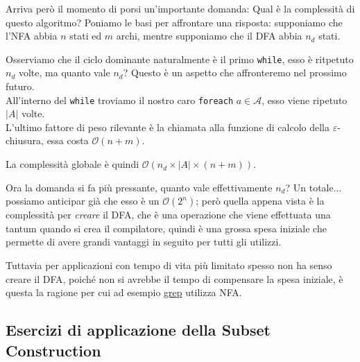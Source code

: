 \documentclass[class=book, crop=false, oneside, 12pt]{standalone}
\begin{document}
\noindent Arriva però il momento di porsi un'importante domanda: Qual è la complessità di questo algoritmo?
Poniamo le basi per affrontare una risposta: supponiamo che l’NFA abbia \(n\) stati ed \(m\) archi, mentre supponiamo che il DFA abbia \(n_d\) stati.

Osserviamo che il ciclo dominante naturalmente è il primo \texttt{while}, esso è ritpetuto \(n_d\) volte, ma quanto vale \(n_d\)? Questo è un aspetto che affronteremo nel prossimo futuro. \\
All'interno del \texttt{while} troviamo il nostro caro \texttt{foreach} \(a \in \mathcal{A}\), esso viene ripetuto \(|A|\) volte.\\
L'ultimo fattore di peso rilevante è la chiamata alla funzione di calcolo della \(\varepsilon\)-chiusura, essa costa \(\mathcal{O}(n+m)\).

La complessità globale è quindi \( \mathcal{O}(n_d \times |A| \times (n+m))\).

Ora la domanda si fa più pressante, quanto vale effettivamente \(n_d\)?
Un totale... possiamo anticipar già che esso è un \(\mathcal{O}(2^n)\); però quella appena vista è la complessità per \emph{creare} il DFA, che è una operazione che viene effettuata una tantum quando si crea il compilatore, quindi è una grossa spesa iniziale che permette di avere grandi vantaggi in seguito per tutti gli utilizzi.

Tuttavia per applicazioni con tempo di vita più limitato spesso non ha senso creare il DFA, poiché non si avrebbe il tempo di compensare la spesa iniziale, è questa la ragione per cui ad esempio \href{https://it.wikipedia.org/wiki/Grep}{grep} utilizza NFA.


\subsection{Esercizi di applicazione della Subset Construction}
\end{document}
